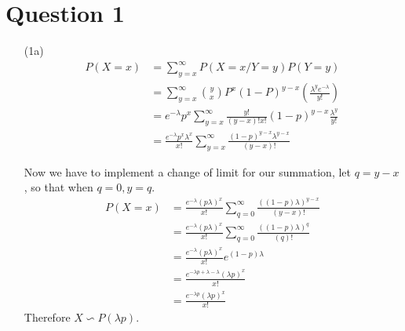 \documentclass[12pt,a4paper]{article}
\begin{document}
\section*{Question 1}
\begin{itemize}
\item[(1a)]
\begin{align*}
P\left(X=x\right)&=\sum _{y=x}^{\infty} P \left(X=x/Y=y\right)P\left(Y=y\right)\\
&=\sum _{y=x}^{\infty}{y \choose x}  P^{x} \left(1-P \right) ^{y-x} \left(\frac{\lambda ^{y}e^{-\lambda}}{y!}\right)\\
&=e^{-\lambda}p^{x}\sum _{y=x}^{\infty}\frac{y!}{\left(y-x\right)!x!}\left(1-p\right)^{y-x}\frac{\lambda^{y}}{y!}\\
&=\frac{e^{-\lambda}p^{x}\lambda^{x}}{x!}\sum _{y=x}^{\infty}\frac{\left(1-p\right)^{y-x}\lambda^{y-x}}{\left(y-x\right)!}
\end{align*}

Now we have to implement a change of limit for our summation, let $q=y-x$, so that when $q=0,y=q $.
\begin{align*}
P\left(X=x\right)&=\frac{e^{-\lambda}\left(p\lambda\right)^{x}}{x!}\sum _{q=0}^{\infty}\frac{\left(\left(1-p\right)\lambda\right)^{y-x}}{\left(y-x\right)!}\\
&=\frac{e^{-\lambda}\left(p\lambda\right)^{x}}{x!}\sum _{q=0}^{\infty}\frac{\left(\left(1-p\right)\lambda\right)^{q}}{\left(q\right)!}\\
&=\frac{e^{-\lambda}\left(p\lambda\right)^{x}}{x!}e^{\left(1-p\right)\lambda}\\
&=\frac{e^{-\lambda p + \lambda-\lambda}\left(\lambda p\right)^{x}}{x!}\\
&=\frac{e^{-\lambda p}\left(\lambda p\right)^{x}}{x!}
\end{align*}
Therefore $X\backsim P\left(\lambda p\right)$.


\end{itemize}
\end{document}
